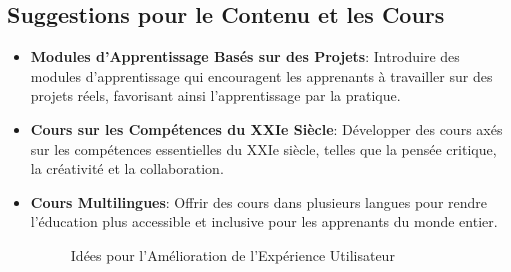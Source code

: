 \subsection{Suggestions pour le Contenu et les Cours}
\begin{itemize}[leftmargin=*,label=\textbullet,font=\color{violet}]
    
    \item \textbf{Modules d'Apprentissage Basés sur des Projets}: Introduire des modules d'apprentissage qui encouragent les apprenants à travailler sur des projets réels, favorisant ainsi l'apprentissage par la pratique.
    \item \textbf{Cours sur les Compétences du XXIe Siècle}: Développer des cours axés sur les compétences essentielles du XXIe siècle, telles que la pensée critique, la créativité et la collaboration.
    \item \textbf{Cours Multilingues}: Offrir des cours dans plusieurs langues pour rendre l'éducation plus accessible et inclusive pour les apprenants du monde entier.
    \begin{figure}[H]
        \centering
        \caption{Idées pour l'Amélioration de l'Expérience Utilisateur}
        \label{fig:ideas-tikz}
    \end{figure}

\end{itemize}

